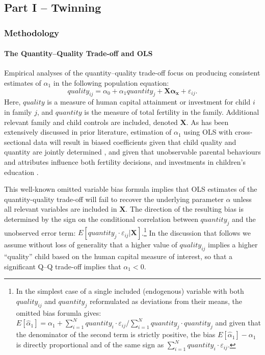 \documentclass[subeqn]{article}
\begin{document}
\begin{spacing}{1.4}
\part*{Part I -- Twinning}
\section{Methodology}
\label{TWINscn:method}
\subsection{The Quantity--Quality Trade-off and OLS}
\label{sscn:OLS}
Empirical analyses of the quantity--quality trade-off focus on producing
consistent estimates of $\alpha_1$ in the following population equation:
\begin{equation}
  \label{TWINeqn:RF}
  quality_{ij}=\alpha_0+\alpha_1 quantity_{j} + \bm{X}\bm{\alpha_x}+\varepsilon_{ij}.
\end{equation}
Here, $quality$ is a measure of human capital attainment or investment for child
$i$ in family $j$, and $quantity$ is the measure of total fertility in the
family. Additional relevant family and child controls are included, denoted $\bm{X}$.
As has been extensively discussed in prior literature, estimation of $\alpha_1$
using OLS with cross-sectional data will result in biased coefficients given that
child quality and quantity are jointly determined \citep{BeckerLewis1973,
  BeckerTomes1976}, and given that unobservable parental behaviours and attributes
influence both fertility decisions, and investments in children's education
\citep{Qian2009}.

This well-known omitted variable bias formula implies that OLS estimates of
the quantity-quality trade-off will fail to recover the underlying parameter
$\alpha$ unless all relevant variables are included in $\bm{X}$. The direction
of the resulting bias is determined by the sign on the conditional correlation
between $quantity_j$ and the unobserved error term:
$E[quantity_{j}\cdot\varepsilon_{ij}|\bm{X}]$.\footnote{In the simplest case
  of a single included (endogenous) variable with both $quality_{ij}$ and
  $quantity_j$ reformulated as deviations from their means, the omitted bias
  forumla gives:
  $
  E[\hat\alpha_1]=\alpha_1+\sum_{i=1}^N quantity_i\cdot\varepsilon_{ij}/\sum_{i=1}^N quantity_j\cdot quantity_j
  $
  and given that the denominator of the second term is strictly positive, the
  bias $E[\hat\alpha_1]-\alpha_1$ is directly proportional and of the same
  sign as $\sum_{i=1}^N quantity_i\cdot\varepsilon_{ij}$.
}
In the discussion that follows we assume without loss of generality that a higher
value of $quality_{ij}$ implies a higher ``quality'' child based on the human capital
measure of interest, so that a significant Q--Q trade-off implies that $\alpha_1<0$.


\end{spacing}
\end{document}
